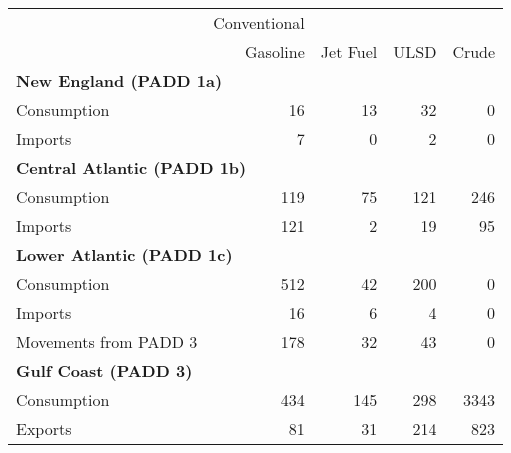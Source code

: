 \begin{tabular}{lrrrr}
   \midrule & Conventional & &  & \\

                         & Gasoline & Jet Fuel & ULSD & Crude \\
                        \midrule \multicolumn{5}{l}{\textbf{New England (PADD 1a)}} \\
Consumption & 16 & 13 & 32 & 0 \\ 
  Imports & 7 & 0 & 2 & 0 \\ 
   \midrule \multicolumn{5}{l}{\textbf{Central Atlantic (PADD 1b)}} \\
Consumption & 119 & 75 & 121 & 246 \\ 
  Imports & 121 & 2 & 19 & 95 \\ 
   \midrule \multicolumn{5}{l}{\textbf{Lower Atlantic (PADD 1c)}} \\
Consumption & 512 & 42 & 200 & 0 \\ 
  Imports & 16 & 6 & 4 & 0 \\ 
  Movements from PADD 3 & 178 & 32 & 43 & 0 \\ 
   \midrule \multicolumn{5}{l}{\textbf{Gulf Coast (PADD 3)}} \\
Consumption & 434 & 145 & 298 & 3343 \\ 
  Exports & 81 & 31 & 214 & 823 \\ 
   \hline
\end{tabular}
